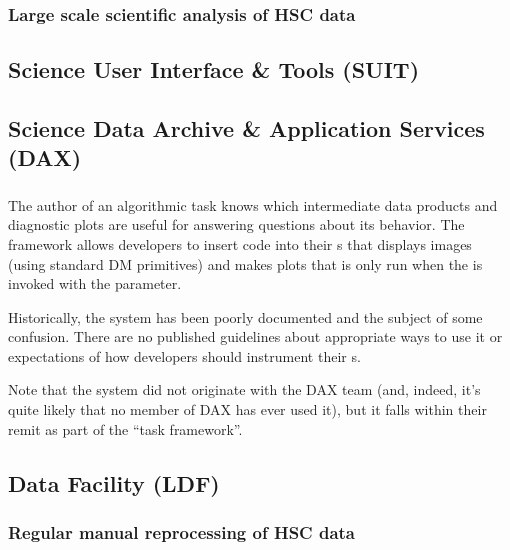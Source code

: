 \documentclass[DM,authoryear,toc,lsstdraft]{lsstdoc}
\begin{document}
\subsubsection{Large scale scientific analysis of HSC data}
\label{sec:current:drp:hsc}

\subsection{Science User Interface \& Tools (SUIT)}
\label{sec:current:suit}

\subsection{Science Data Archive \& Application Services (DAX)}
\label{sec:current:dax}

\subsubsection{}
\label{sec:current:dax:debugopt}

The author of an algorithmic task knows which intermediate data products and
diagnostic plots are useful for answering questions about its behavior. The
 framework allows developers to insert code into their
s that displays images (using standard DM primitives) and makes
plots that is only run when the  is invoked with the
 parameter.

Historically, the  system has been poorly documented and the
subject of some confusion. There are no published guidelines about appropriate
ways to use it or expectations of how developers should instrument their
s.

Note that the  system did not originate with the DAX team
(and, indeed, it's quite likely that no member of DAX has ever used it), but
it falls within their remit as part of the ``task framework''.

\subsection{Data Facility (LDF)}
\label{sec:current:ldf}

\subsubsection{Regular manual reprocessing of HSC data}
\label{sec:current:ldf:hsc}
\end{document}
